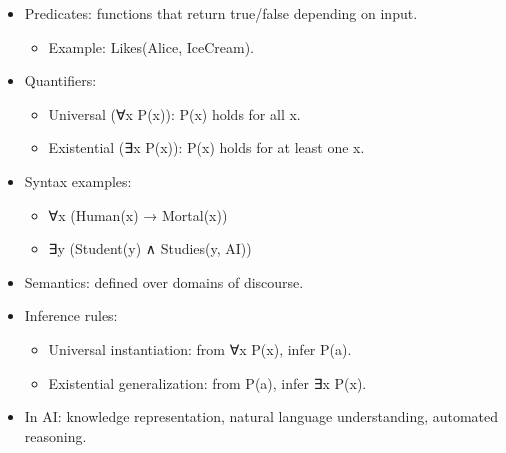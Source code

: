 \documentclass[
  letterpaper,
  DIV=11,
  numbers=noendperiod]{scrreprt}
\providecommand{\tightlist}{%
  \setlength{\itemsep}{0pt}\setlength{\parskip}{0pt}}
\begin{document}
\begin{itemize}
\item
  Predicates: functions that return true/false depending on input.

  \begin{itemize}
  \tightlist
  \item
    Example: Likes(Alice, IceCream).
  \end{itemize}
\item
  Quantifiers:

  \begin{itemize}
  \tightlist
  \item
    Universal (∀x P(x)): P(x) holds for all x.
  \item
    Existential (∃x P(x)): P(x) holds for at least one x.
  \end{itemize}
\item
  Syntax examples:

  \begin{itemize}
  \tightlist
  \item
    ∀x (Human(x) → Mortal(x))
  \item
    ∃y (Student(y) ∧ Studies(y, AI))
  \end{itemize}
\item
  Semantics: defined over domains of discourse.
\item
  Inference rules:

  \begin{itemize}
  \tightlist
  \item
    Universal instantiation: from ∀x P(x), infer P(a).
  \item
    Existential generalization: from P(a), infer ∃x P(x).
  \end{itemize}
\item
  In AI: knowledge representation, natural language understanding,
  automated reasoning.
\end{itemize}
\end{document}
